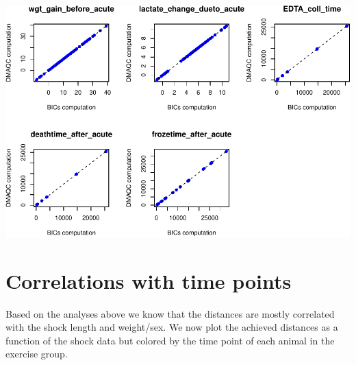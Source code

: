 \documentclass[]{article}
\newenvironment{Shaded}{\begin{snugshade}}{\end{snugshade}}
\newcommand{\KeywordTok}[1]{\textcolor[rgb]{0.13,0.29,0.53}{\textbf{#1}}}
\newcommand{\DataTypeTok}[1]{\textcolor[rgb]{0.13,0.29,0.53}{#1}}
\newcommand{\DecValTok}[1]{\textcolor[rgb]{0.00,0.00,0.81}{#1}}
\newcommand{\StringTok}[1]{\textcolor[rgb]{0.31,0.60,0.02}{#1}}
\newcommand{\CommentTok}[1]{\textcolor[rgb]{0.56,0.35,0.01}{\textit{#1}}}
\newcommand{\ControlFlowTok}[1]{\textcolor[rgb]{0.13,0.29,0.53}{\textbf{#1}}}
\newcommand{\OperatorTok}[1]{\textcolor[rgb]{0.81,0.36,0.00}{\textbf{#1}}}
\newcommand{\NormalTok}[1]{#1}
\begin{document}
\begin{center}\includegraphics[width=0.9\linewidth,height=0.9\textheight]{pheno_csv_files_analysis_files/figure-latex/unnamed-chunk-7-1} \end{center}

\section{Correlations with time
points}\label{correlations-with-time-points}

Based on the analyses above we know that the distances are mostly
correlated with the shock length and weight/sex. We now plot the
achieved distances as a function of the shock data but colored by the
time point of each animal in the exercise group.

\begin{Shaded}
\end{Shaded}
\end{document}
